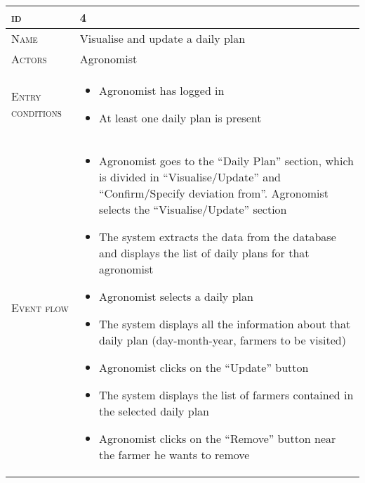 \begin{table}[H]
    \centering
    \begin{tabular}[c]{|l|p{}|}
        \hline %
    	\textsc{id}                 &   4\\
    	\hline %
    	\textsc{Name}               &   Visualise and update a daily plan\\
    	\hline %
    	\textsc{Actors}             &   Agronomist\\
    	\hline %
    	\textsc{Entry conditions}   &   \begin{itemize}
                                    	    \item Agronomist has logged in
                                    	    \item At least one daily plan is present
                                        \end{itemize}\\
    	\hline %
    	\textsc{Event flow}         &   %
            	                        \begin{itemize}
                                    	    \item Agronomist goes to the “Daily Plan” section, which is divided in “Visualise/Update” and “Confirm/Specify deviation from”. Agronomist selects the “Visualise/Update” section
                                    		\item The system extracts the data from the database and displays the list of daily plans for that agronomist
                                    		\item Agronomist selects a daily plan
                                    		\item The system displays all the information about that daily plan (day-month-year, farmers to be visited)
                                    		\item Agronomist clicks on the “Update” button
                                    		\item The system displays the list of farmers contained in the selected daily plan
                                    		\item Agronomist clicks on the “Remove” button near the farmer he wants to remove

\end{itemize}
\end{tabular}
\end{table}
